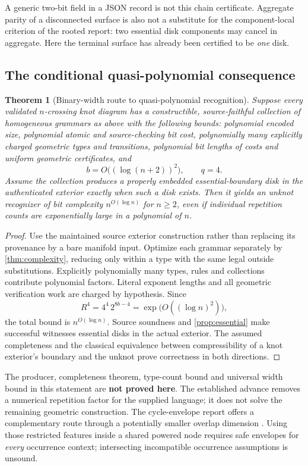\documentclass[11pt,a4paper]{article}
\newtheorem{theorem}{Theorem}[section]
\theoremstyle{definition}
\begin{document}
A generic two-bit field in a JSON record is not this chain certificate. Aggregate parity of a disconnected surface is also not a substitute for the component-local criterion of the rooted report: two essential disk components may cancel in aggregate. Here the terminal surface has already been certified to be \emph{one} disk.

\subsection{The conditional quasi-polynomial consequence}
\begin{theorem}[Binary-width route to quasi-polynomial recognition]\label{thm:qp}
Suppose every validated $n$-crossing knot diagram has a constructible, source-faithful collection of homogeneous grammars as above with the following bounds: polynomial encoded size, polynomial atomic and source-checking bit cost, polynomially many explicitly charged geometric types and transitions, polynomial bit lengths of costs and uniform geometric certificates, and
\[
b=O\bigl((\log(n+2))^2\bigr),\qquad q=4.
\]
Assume the collection produces a properly embedded essential-boundary disk in the authenticated exterior exactly when such a disk exists. Then it yields an unknot recognizer of bit complexity $n^{O(\log n)}$ for $n\ge2$, even if individual repetition counts are exponentially large in a polynomial of $n$.
\end{theorem}
\begin{proof}
Use the maintained source exterior construction rather than replacing its provenance by a bare manifold input. Optimize each grammar separately by \cref{thm:complexity}, reducing only within a type with the same legal outside substitutions. Explicitly polynomially many types, rules and collections contribute polynomial factors. Literal exponent lengths and all geometric verification work are charged by hypothesis. Since
\[
R^4=4^4\,2^{8b-4}=\exp\bigl(O((\log n)^2)\bigr),
\]
the total bound is $n^{O(\log n)}$. Source soundness and \cref{prop:essential} make successful witnesses essential disks in the actual exterior. The assumed completeness and the classical equivalence between compressibility of a knot exterior's boundary and the unknot \cite{lackenby} prove correctness in both directions.
\end{proof}

The producer, completeness theorem, type-count bound and universal width bound in this statement are \textbf{not proved here}. The established advance removes a numerical repetition factor for the supplied language; it does not solve the remaining geometric construction. The cycle-envelope report offers a complementary route through a potentially smaller overlap dimension \cite{cycle}. Using those restricted features inside a shared powered node requires safe envelopes for \emph{every} occurrence context; intersecting incompatible occurrence assumptions is unsound.
\end{document}
